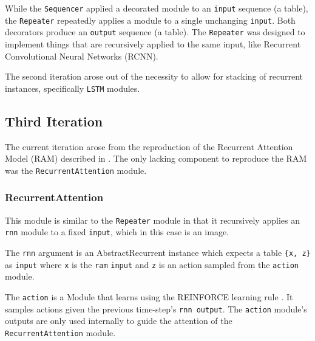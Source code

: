 \documentclass{article} %
\providecommand{\inlinecode}[1]{\texttt{#1}}
\begin{document}


While the \inlinecode{Sequencer} applied a decorated module to an \inlinecode{input} sequence (a table), 
the \inlinecode{Repeater} repeatedly applies a module to a single unchanging \inlinecode{input}. 
Both decorators produce an \inlinecode{output} sequence (a table). 
The \inlinecode{Repeater} was designed to implement things that are recursively applied to the same input,
like Recurrent Convolutional Neural Networks (RCNN)\cite{pinheiro2013recurrent}.

The second iteration arose out of the necessity to allow for stacking of recurrent instances, 
specifically \inlinecode{LSTM} modules. 

\subsection{Third Iteration}

The current iteration arose from the reproduction of the Recurrent Attention Model (RAM) 
described in \cite{mnih2014recurrent}.
The only lacking component to reproduce the RAM was the \inlinecode{RecurrentAttention}
module.

\subsubsection{RecurrentAttention}
This module is similar to the \inlinecode{Repeater} module in that it recursively applies 
an \inlinecode{rnn} module to a fixed \inlinecode{input}, which in this case is an image.



The \inlinecode{rnn} argument is an AbstractRecurrent instance
which expects a table \inlinecode{\{x, z\}} as \inlinecode{input} 
where \inlinecode{x} is the \inlinecode{ram} \inlinecode{input} and 
\inlinecode{z} is an action sampled from the \inlinecode{action} module. 

The \inlinecode{action} is a Module that learns using the 
REINFORCE learning rule \cite{williams1992simple}.
It samples actions given the previous time-step's \inlinecode{rnn output}. 
The \inlinecode{action} module's outputs are only used internally to guide 
the attention of the \inlinecode{RecurrentAttention} module.
\end{document}
